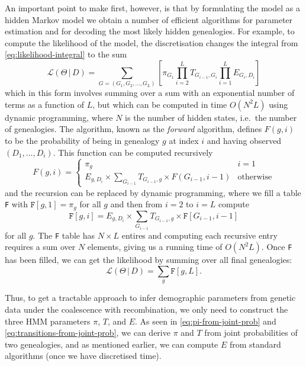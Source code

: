 \documentclass[graybox]{svmult}
\newcommand{\G}{\ensuremath{G}}
\renewcommand{\D}{\ensuremath{D}}
\renewcommand{\lhd}{\ensuremath{\mathcal{L}}}
\newcommand{\T}{\ensuremath{T}}
\renewcommand{\E}{\ensuremath{E}}
\begin{document}
An important point to make first, however, is that by formulating the model as a hidden Markov model we obtain a number of efficient algorithms for parameter estimation and for decoding the most likely hidden genealogies. For example, to compute the likelihood of the model, the discretisation changes the integral from \eqref{eq:likelihood-integral} to the sum
\begin{equation}
  \label{eq:likelhood-sum}
  \lhd(\Theta\,|\,\D) = 
  \sum_{\G=(\G_1,\G_2,\ldots,\G_L)} 
  	\left[
   	  \pi_{\G_1}
  	  \prod_{i=2}^{L}\T_{\G_{i-1},\G_{i}}
  	  \prod_{i=1}^L  \E_{\G_i,\D_i}
  	\right]
\end{equation}
which in this form involves summing over a sum with an exponential number of terms as a function of $L$, but which can be computed in time $O(N^2L)$ using dynamic programming, where $N$ is the number of hidden states, i.e.\ the number of genealogies. The algorithm, known as the \emph{forward} algorithm, defines $F(g,i)$ to be the probability of being in genealogy $g$ at index $i$ and having observed $(\D_1,\ldots,\D_i)$. This function can be computed recursively
\begin{equation}
  F(g,i) = 
  \begin{cases}
  	\pi_g & i = 1 \\
  	\E_{g,\D_i} \times \sum_{\G_{i-1}}\T_{\G_{i-1},g} \times F(\G_{i-1},i-1)
  	& \mathrm{otherwise}
  \end{cases}
\end{equation}
and the recursion can be replaced by dynamic programming, where we fill a table \texttt{F} with $\mathtt{F}[g,1] = \pi_g$ for all $g$ and then from $i=2$ to $i=L$ compute
\[
\mathtt{F}[g,i] = \E_{g,\D_i} \times \sum_{\G_{i-1}}\T_{\G_{i-1},g} \times \mathtt{F}[\G_{i-1},i-1]
\]
for all $g$. The \texttt{F} table has $N\times L$ entires and computing each recursive entry requires a sum over $N$ elements, giving us a running time of $O(N^2L)$. Once \texttt{F} has been filled, we can get the likelihood by summing over all final genealogies:
\begin{equation}
  \lhd(\Theta\,|\,\D) = \sum_{g} \mathtt{F}[g,L].
\end{equation}

Thus, to get a tractable approach to infer demographic parameters from genetic data under the coalescence with recombination, we only need to construct the three HMM parameters $\pi$, $\T$, and $\E$. As seen in \eqref{eq:pi-from-joint-prob} and \eqref{eq:transitions-from-joint-prob}, we can derive $\pi$ and $\T$ from joint probabilities of two genealogies, and as mentioned earlier, we can compute $\E$ from standard algorithms (once we have discretised time).
\end{document}
